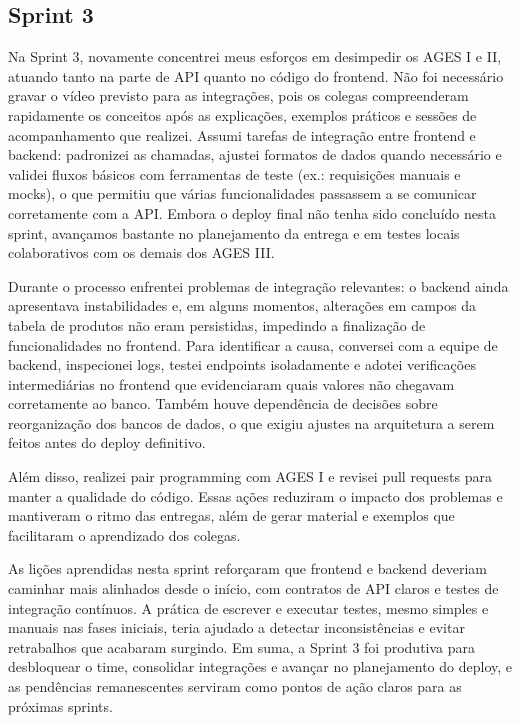 \subsection{Sprint 3}
 
Na Sprint 3, novamente concentrei meus esforços em desimpedir os AGES I e II, atuando tanto na parte de API quanto no código do frontend. Não foi necessário gravar o vídeo previsto para as integrações, pois os colegas compreenderam rapidamente os conceitos após as explicações, exemplos práticos e sessões de acompanhamento que realizei. Assumi tarefas de integração entre frontend e backend: padronizei as chamadas, ajustei formatos de dados quando necessário e validei fluxos básicos com ferramentas de teste (ex.: requisições manuais e mocks), o que permitiu que várias funcionalidades passassem a se comunicar corretamente com a API. Embora o deploy final não tenha sido concluído nesta sprint, avançamos bastante no planejamento da entrega e em testes locais colaborativos com os demais dos AGES III.

Durante o processo enfrentei problemas de integração relevantes: o backend ainda apresentava instabilidades e, em alguns momentos, alterações em campos da tabela de produtos não eram persistidas, impedindo a finalização de funcionalidades no frontend. Para identificar a causa, conversei com a equipe de backend, inspecionei logs, testei endpoints isoladamente e adotei verificações intermediárias no frontend que evidenciaram quais valores não chegavam corretamente ao banco. Também houve dependência de decisões sobre reorganização dos bancos de dados, o que exigiu ajustes na arquitetura a serem feitos antes do deploy definitivo.

Além disso, realizei pair programming com AGES I e revisei pull requests para manter a qualidade do código. Essas ações reduziram o impacto dos problemas e mantiveram o ritmo das entregas, além de gerar material e exemplos que facilitaram o aprendizado dos colegas.

As lições aprendidas nesta sprint reforçaram que frontend e backend deveriam caminhar mais alinhados desde o início, com contratos de API claros e testes de integração contínuos. A prática de escrever e executar testes, mesmo simples e manuais nas fases iniciais, teria ajudado a detectar inconsistências e evitar retrabalhos que acabaram surgindo. Em suma, a Sprint 3 foi produtiva para desbloquear o time, consolidar integrações e avançar no planejamento do deploy, e as pendências remanescentes serviram como pontos de ação claros para as próximas sprints.
